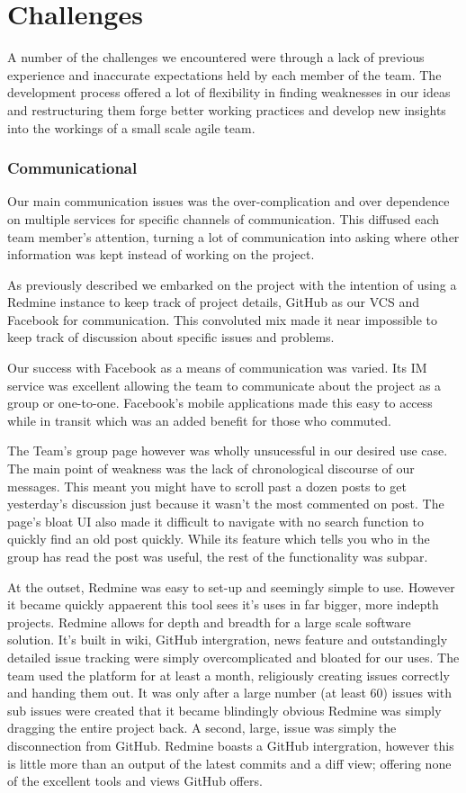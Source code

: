 \documentclass{l3proj}
\begin{document}
\chapter{Challenges}
\label{Challenges}

A number of the challenges we encountered were through a lack of previous
experience and inaccurate expectations held by each member of the team. The
development process offered a lot of flexibility in finding weaknesses in our
ideas and restructuring them forge better working practices and develop new
insights into the workings of a small scale agile team.

\subsection{Communicational}
Our main communication issues was the over-complication and over dependence on multiple services for specific channels of communication. This diffused each team member's attention, turning a lot of communication into asking where other information was kept instead of working on the project.

As previously described we embarked on the project with the intention of using a Redmine instance to keep track of project details, GitHub as our VCS and Facebook for communication. This convoluted mix made it near impossible to keep track of discussion about specific issues and problems.

Our success with Facebook as a means of communication was varied. Its IM service was excellent allowing the team to communicate about the project as a group or one-to-one. Facebook's mobile applications made this easy to access while in transit which was an added benefit for those who commuted.

The Team's group page however was wholly unsucessful in our desired use case. The main point of weakness was the lack of chronological discourse of our messages. This meant you might have to scroll past a dozen posts to get yesterday's discussion just because it wasn't the most commented on post. The page's bloat UI also made it difficult to navigate with no search function to quickly find an old post quickly. While its feature which tells you who in the group has read the post was useful, the rest of the functionality was subpar.

At the outset, Redmine was easy to set-up and seemingly simple to use. However it became quickly appaerent this tool sees it's uses in far bigger, more indepth projects. 
Redmine allows for depth and breadth for a large scale software solution. It's built in wiki, GitHub intergration, news feature and outstandingly detailed issue tracking were simply overcomplicated and bloated for our uses.
The team used the platform for at least a month, religiously creating issues correctly and handing them out. It was only after a large number (at least 60) issues with sub issues were created that it became blindingly obvious Redmine was simply dragging the entire project back.
A second, large, issue was simply the disconnection from GitHub. Redmine boasts a GitHub intergration, however this is little more than an output of the latest commits and a diff view; offering none of the excellent tools and views GitHub offers.
\end{document}
